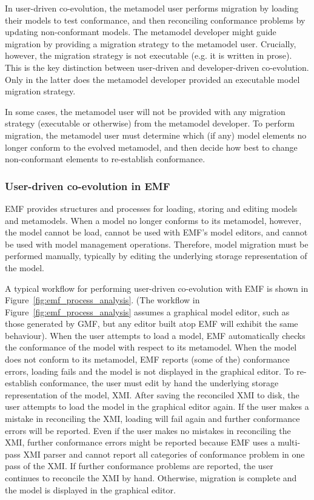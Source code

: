 In user-driven co-evolution, the metamodel user performs migration by loading their models to test conformance, and then reconciling conformance problems by updating non-conformant models. The metamodel developer might guide migration by providing a migration strategy to the metamodel user. Crucially, however, the migration strategy is not executable (e.g. it is written in prose). This is the key distinction between user-driven and developer-driven co-evolution. Only in the latter does the metamodel developer provided an executable model migration strategy.  

In some cases, the metamodel user will not be provided with any migration strategy (executable or otherwise) from the metamodel developer. To perform migration, the metamodel user must determine which (if any) model elements no longer conform to the evolved metamodel, and then decide how best to change non-conformant elements to re-establish conformance.

\subsubsection{User-driven co-evolution in EMF}
EMF provides structures and processes for loading, storing and editing models and metamodels. When a model no longer conforms to its metamodel, however, the model cannot be load, cannot be used with EMF's model editors, and cannot be used with model management operations. Therefore, model migration must be performed manually, typically by editing the underlying storage representation of the model.
 
A typical workflow for performing user-driven co-evolution with EMF is shown in Figure~\ref{fig:emf_process_analysis}. (The workflow in Figure~\ref{fig:emf_process_analysis} assumes a graphical model editor, such as those generated by GMF, but any editor built atop EMF will exhibit the same behaviour). When the user attempts to load a model, EMF automatically checks the conformance of the model with respect to its metamodel. When the model does not conform to its metamodel, EMF reports (some of the) conformance errors, loading fails and the model is not displayed in the graphical editor. To re-establish conformance, the user must edit by hand the underlying storage representation of the model, XMI. After saving the reconciled XMI to disk, the user attempts to load the model in the graphical editor again. If the user makes a mistake in reconciling the XMI, loading will fail again and further conformance errors will be reported. Even if the user makes no mistakes in reconciling the XMI, further conformance errors might be reported because EMF uses a multi-pass XMI parser and cannot report all categories of conformance problem in one pass of the XMI. If further conformance problems are reported, the user continues to reconcile the XMI by hand. Otherwise, migration is complete and the model is displayed in the graphical editor. 

